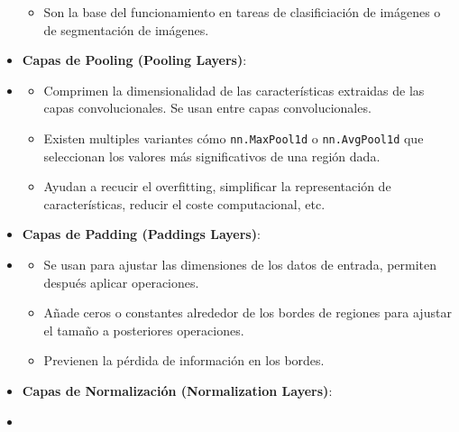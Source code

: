 \begin{itemize}
\begin{itemize}
            \item Son la base del funcionamiento en tareas de clasificiación de imágenes o de segmentación de imágenes.
        \end{itemize}
    \item \textbf{Capas de Pooling (Pooling Layers)}:
    \item[]
        \begin{itemize}
            \item Comprimen la dimensionalidad de las características extraidas de las capas convolucionales. Se usan entre capas convolucionales.
            \item Existen multiples variantes cómo \texttt{nn.MaxPool1d} o \texttt{nn.AvgPool1d} que seleccionan los valores más significativos de una región dada.
            \item Ayudan a recucir el {overfitting}, simplificar la representación de características, reducir el coste computacional, etc.
        \end{itemize}
    \item \textbf{Capas de Padding (Paddings Layers)}:
    \item[]
        \begin{itemize}
            \item Se usan para ajustar las dimensiones de los datos de entrada, permiten después aplicar operaciones.
            \item Añade ceros o constantes alrededor de los bordes de regiones para ajustar el tamaño a posteriores operaciones.
            \item Previenen la pérdida de información en los bordes.
        \end{itemize}
    \item \textbf{Capas de Normalización (Normalization Layers)}:
    \item[]

\end{itemize}
